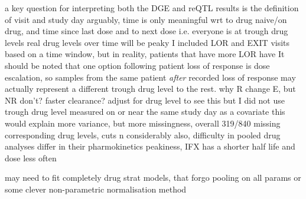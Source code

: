 \begin{outline}
    \2 a key question for interpreting both the DGE and reQTL results is the definition of visit and study day
        \3 arguably, time is only meaningful wrt to drug naive/on drug, and time since last dose and to next dose i.e. everyone is at trough drug levels
        \3 real drug levels over time will be peaky %
        \3 I included LOR and EXIT visits based on a time window, but in reality, patients that have more LOR have 
        \3 It should be noted that one option following patient loss of response is dose escalation, so samples from the same patient \emph{after} recorded loss of response may actually represent a different trough drug level to the rest.
    \2    %
        \3 why R change E, but NR don't? faster clearance? adjust for drug level to see this
        \3 but I did not use trough drug level measured on or near the same study day as a covariate
        \3 this would explain more variance, but
            more missingness, overall 319/840 missing corresponding drug levels, cuts n considerably
        \3 also, difficulty in pooled drug analyses
        \3 differ in their pharmokinetics peakiness, IFX has a shorter half life and dose less often \autocite{lichtenstein2013ComprehensiveReviewAntitumor}

        \3 may need to fit completely drug strat models, that forgo pooling on all params
        \3 or some clever non-parametric normalisation method


\end{outline}
